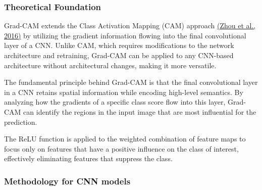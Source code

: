 \documentclass[a4paper,12pt]{report}
\begin{document}
\subsubsection{Theoretical Foundation}

Grad-CAM extends the Class Activation Mapping (CAM) approach \href{https://arxiv.org/abs/1512.04150}{(Zhou et al., 2016)} by utilizing the gradient information flowing into the final convolutional layer of a CNN. Unlike CAM, which requires modifications to the network architecture and retraining, Grad-CAM can be applied to any CNN-based architecture without architectural changes, making it more versatile.

The fundamental principle behind Grad-CAM is that the final convolutional layer in a CNN retains spatial information while encoding high-level semantics. By analyzing how the gradients of a specific class score flow into this layer, Grad-CAM can identify the regions in the input image that are most influential for the prediction.


The ReLU function is applied to the weighted combination of feature maps to focus only on features that have a positive influence on the class of interest, effectively eliminating features that suppress the class.

\subsubsection{Methodology for CNN models}
\end{document}
